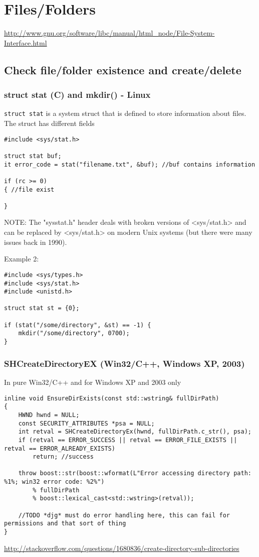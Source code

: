 \chapter{Files/Folders}

\url{http://www.gnu.org/software/libc/manual/html_node/File-System-Interface.html}

\section{Check file/folder existence and create/delete}

\subsection{struct stat (C) and mkdir() - Linux}

\verb!struct stat! is a system struct that is defined to store information about
files. The struct has different fields
\begin{verbatim}
#include <sys/stat.h>

struct stat buf;
it error_code = stat("filename.txt", &buf); //buf contains information

if (rc >= 0) 
{ //file exist
  
}
\end{verbatim}

NOTE:  The "sysstat.h" header deals with broken versions of <sys/stat.h> and can
be replaced by <sys/stat.h> on modern Unix systems (but there were many issues
back in 1990).

Example 2:
\begin{verbatim}
#include <sys/types.h>
#include <sys/stat.h>
#include <unistd.h>

struct stat st = {0};

if (stat("/some/directory", &st) == -1) {
    mkdir("/some/directory", 0700);
}
\end{verbatim}



\subsection{SHCreateDirectoryEX  (Win32/C++, Windows XP, 2003)}

In pure Win32/C++ and for Windows XP and 2003 only
\begin{verbatim}
inline void EnsureDirExists(const std::wstring& fullDirPath)
{
    HWND hwnd = NULL;
    const SECURITY_ATTRIBUTES *psa = NULL;
    int retval = SHCreateDirectoryEx(hwnd, fullDirPath.c_str(), psa);
    if (retval == ERROR_SUCCESS || retval == ERROR_FILE_EXISTS || retval == ERROR_ALREADY_EXISTS)
        return; //success

    throw boost::str(boost::wformat(L"Error accessing directory path: %1%; win32 error code: %2%") 
        % fullDirPath
        % boost::lexical_cast<std::wstring>(retval));

    //TODO *djg* must do error handling here, this can fail for permissions and that sort of thing
}
\end{verbatim}
\url{http://stackoverflow.com/questions/1680836/create-directory-sub-directories}

